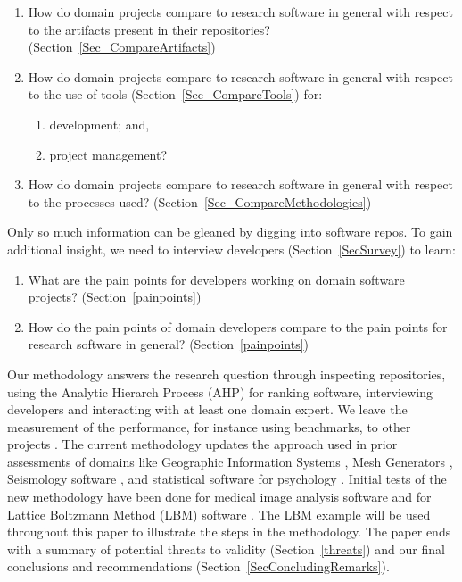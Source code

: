 \documentclass[runningheads]{llncs}
\newcounter{rqnum} %
\newcommand{\rqref}[1]{RQ\ref{#1}}
\begin{document}
\begin{enumerate}
  \item [RQ\refstepcounter{rqnum}\therqnum \label{RQ_CompareArtifacts}:] How
	do domain projects compare to research software in general with respect to the
	artifacts present in their repositories? (Section~\ref{Sec_CompareArtifacts})
	\item [RQ\refstepcounter{rqnum}\therqnum \label{RQ_CompareToolsProjMngmnt}:]
	How do domain projects compare to research software in general with respect to
	the use of tools (Section~\ref{Sec_CompareTools}) for:
	\begin{enumerate} 
		\item [\rqref{RQ_CompareToolsProjMngmnt}.a] development; and,
		\item [\rqref{RQ_CompareToolsProjMngmnt}.b] project management?
	\end{enumerate}
	\item [RQ\refstepcounter{rqnum}\therqnum \label{RQ_CompareMethodologies}:]
	How do domain projects compare to research software in general with respect to
	the processes used? (Section~\ref{Sec_CompareMethodologies})
\end{enumerate}	

Only so much information can be gleaned by digging into software repos.
To gain additional insight, we need to interview developers
(Section~\ref{SecSurvey}) to learn:

\begin{enumerate}
	\item [RQ\refstepcounter{rqnum}\therqnum \label{RQ_PainPoints}:] What are
	the pain points for developers working on domain software projects?
	(Section~\ref{painpoints})
	\item [RQ\refstepcounter{rqnum}\therqnum \label{RQ_ComparePainPoints}:] How
	do the pain points of domain developers compare to the pain points
	for research software in general? (Section~\ref{painpoints})
\end{enumerate}

Our methodology answers the research question through inspecting repositories,
using the Analytic Hierarch Process (AHP) for ranking software, interviewing
developers and interacting with at least one domain expert.  We leave the
measurement of the performance, for instance using benchmarks, to other projects
\cite{KaagstromEtAl1998}. The current methodology updates the approach used in
prior assessments of domains like Geographic Information Systems
\cite{SmithEtAl2018_arXivGIS}, Mesh Generators \cite{SmithEtAl2016}, Seismology
software \cite{SmithEtAl2018}, and statistical software for psychology
\cite{SmithEtAl2018_StatSoft}.  Initial tests of the new methodology have been
done for medical image analysis software \cite{Dong2021} and for Lattice
Boltzmann Method (LBM) software \cite{Michalski2021}.  The LBM example will be
used throughout this paper to illustrate the steps in the methodology.  The
paper ends with a summary of potential threats to validity
(Section~\ref{threats}) and our final conclusions and recommendations
(Section~\ref{SecConcludingRemarks}).
\end{document}
